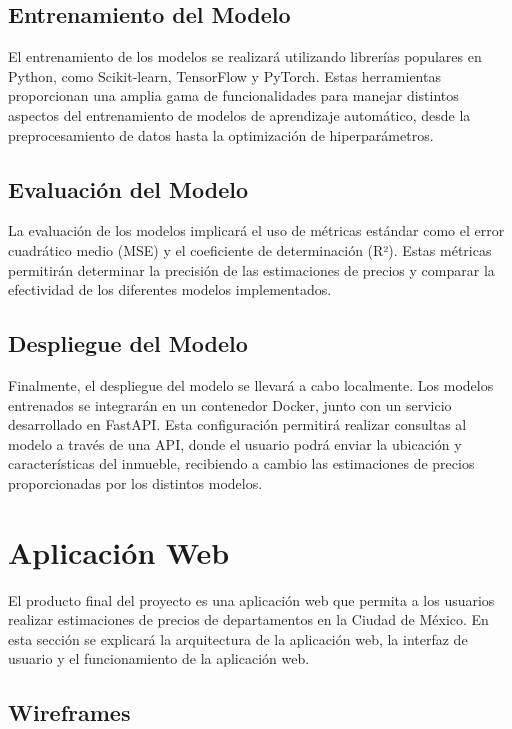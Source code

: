 \subsection{Entrenamiento del Modelo}

El entrenamiento de los modelos se realizará utilizando librerías populares en
Python, como Scikit-learn, TensorFlow y PyTorch. Estas herramientas proporcionan
una amplia gama de funcionalidades para manejar distintos aspectos del entrenamiento
de modelos de aprendizaje automático, desde la preprocesamiento de datos hasta la
optimización de hiperparámetros.

\subsection{Evaluación del Modelo}

La evaluación de los modelos implicará el uso de métricas estándar como el error
cuadrático medio (MSE) y el coeficiente de determinación (R²). Estas métricas
permitirán determinar la precisión de las estimaciones de precios y comparar
la efectividad de los diferentes modelos implementados.

\subsection{Despliegue del Modelo}

Finalmente, el despliegue del modelo se llevará a cabo localmente. Los modelos
entrenados se integrarán en un contenedor Docker, junto con un servicio desarrollado
en FastAPI. Esta configuración permitirá realizar consultas al modelo a través de
una API, donde el usuario podrá enviar la ubicación y características del inmueble,
recibiendo a cambio las estimaciones de precios proporcionadas por los distintos
modelos.


\section{Aplicación Web}

El producto final del proyecto es una aplicación web que permita a los usuarios
realizar estimaciones de precios de departamentos en la Ciudad de México. En
esta sección se explicará la arquitectura de la aplicación web, la interfaz de
usuario y el funcionamiento de la aplicación web.

\subsection{Wireframes}

